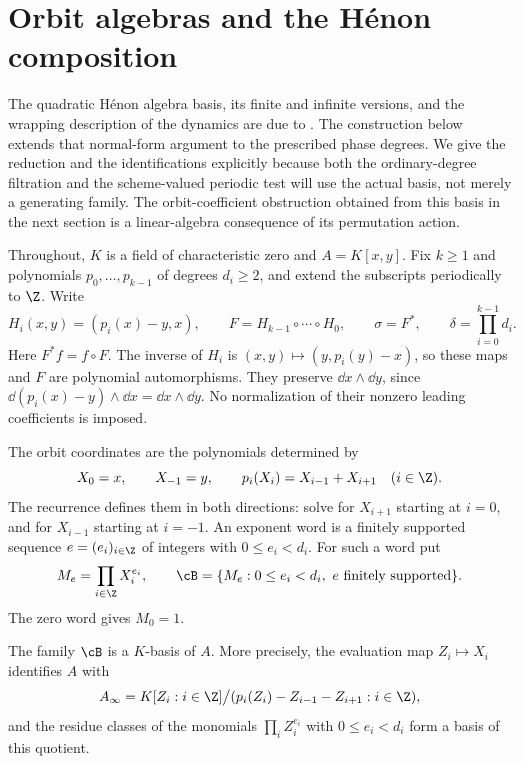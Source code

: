 \section{Orbit algebras and the H\'enon composition}
\label{sec:orbit-algebras}

The quadratic H\'enon algebra basis, its finite and infinite versions, and the
wrapping description of the dynamics are due to
\citet{Bousch1992HenonAlgebras}.  The construction below extends that
normal-form argument to the prescribed phase degrees.  We give the reduction
and the identifications explicitly because both the ordinary-degree filtration
and the scheme-valued periodic test will use the actual basis, not merely a
generating family.  The orbit-coefficient obstruction obtained from this basis
in the next section is a linear-algebra consequence of its permutation action.

Throughout, $K$ is a field of characteristic zero and
$A=K[x,y]$.  Fix $k\ge1$ and polynomials $p_0,\ldots,p_{k-1}$ of degrees
$d_i\ge2$, and extend the subscripts periodically to $\Z$.  Write
\begin{equation}
  H_i(x,y)=(p_i(x)-y,x),\qquad
  F=H_{k-1}\circ\cdots\circ H_0,\qquad
  \sigma=F^*,\qquad \delta=\prod_{i=0}^{k-1}d_i.
  \label{eq:henon-composition}
\end{equation}
Here $F^*f=f\circ F$.  The inverse of $H_i$ is
$(x,y)\mapsto(y,p_i(y)-x)$, so these maps and $F$ are polynomial
automorphisms.  They preserve $\dd x\wedge\dd y$, since
$\dd(p_i(x)-y)\wedge\dd x=\dd x\wedge\dd y$.
No normalization of their nonzero leading coefficients is imposed.

The orbit coordinates are the polynomials determined by
\begin{equation}
  X_0=x,\qquad X_{-1}=y,\qquad
  p_i(X_i)=X_{i-1}+X_{i+1}\quad(i\in\Z).
  \label{eq:orbit-recurrence}
\end{equation}
The recurrence defines them in both directions: solve for $X_{i+1}$
starting at $i=0$, and for $X_{i-1}$ starting at $i=-1$.
An exponent word is a finitely supported sequence
$e=(e_i)_{i\in\Z}$ of integers with $0\le e_i<d_i$.
For such a word put
\begin{equation}
  M_e=\prod_{i\in\Z}X_i^{e_i},\qquad
  \cB=\{M_e:0\le e_i<d_i,\ e\text{ finitely supported}\}.
  \label{eq:standard-orbit-monomials}
\end{equation}
The zero word gives $M_0=1$.

\begin{theorem}
\label{thm:orbit-basis}
The family $\cB$ is a $K$-basis of $A$.  More precisely, the evaluation map
$Z_i\mapsto X_i$ identifies $A$ with
\[
  A_\infty=
  K[Z_i:i\in\Z]\big/
  (p_i(Z_i)-Z_{i-1}-Z_{i+1}:i\in\Z),
\]
and the residue classes of the monomials $\prod_iZ_i^{e_i}$ with
$0\le e_i<d_i$ form a basis of this quotient.
\end{theorem}

